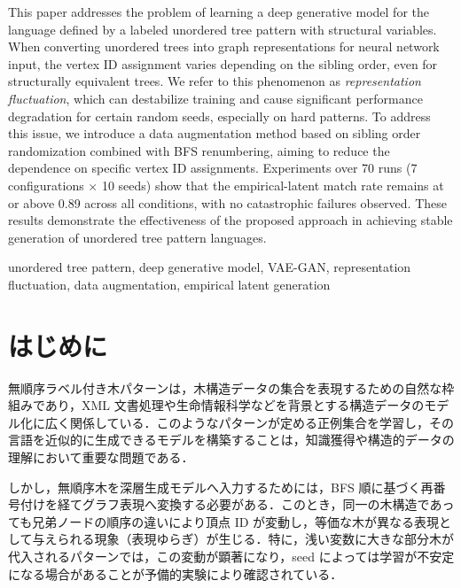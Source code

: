 \documentclass[submit,techrep,noauthor]{ipsj}
\begin{document}
\begin{eabstract}
This paper addresses the problem of learning a deep generative model
for the language defined by a labeled unordered tree pattern with structural variables.
When converting unordered trees into graph representations for neural network input,
the vertex ID assignment varies depending on the sibling order,
even for structurally equivalent trees.
We refer to this phenomenon as \textit{representation fluctuation},
which can destabilize training and cause significant performance degradation
for certain random seeds, especially on hard patterns.
To address this issue, we introduce a data augmentation method
based on sibling order randomization combined with BFS renumbering,
aiming to reduce the dependence on specific vertex ID assignments.
Experiments over 70 runs (7 configurations $\times$ 10 seeds) show that
the empirical-latent match rate remains at or above 0.89 across all conditions,
with no catastrophic failures observed.
These results demonstrate the effectiveness of the proposed approach
in achieving stable generation of unordered tree pattern languages.
\end{eabstract}

\begin{ekeyword}
unordered tree pattern, deep generative model, VAE-GAN,
representation fluctuation, data augmentation, empirical latent generation
\end{ekeyword}

\maketitle


\section{はじめに}

無順序ラベル付き木パターンは，木構造データの集合を表現するための自然な枠組みであり，XML 文書処理や生命情報科学などを背景とする構造データのモデル化に広く関係している．このようなパターンが定める正例集合を学習し，その言語を近似的に生成できるモデルを構築することは，知識獲得や構造的データの理解において重要な問題である．

しかし，無順序木を深層生成モデルへ入力するためには，BFS 順に基づく再番号付けを経てグラフ表現へ変換する必要がある．このとき，同一の木構造であっても兄弟ノードの順序の違いにより頂点 ID が変動し，等価な木が異なる表現として与えられる現象（表現ゆらぎ）が生じる．特に，浅い変数に大きな部分木が代入されるパターンでは，この変動が顕著になり，seed によっては学習が不安定になる場合があることが予備的実験により確認されている．
\end{document}
